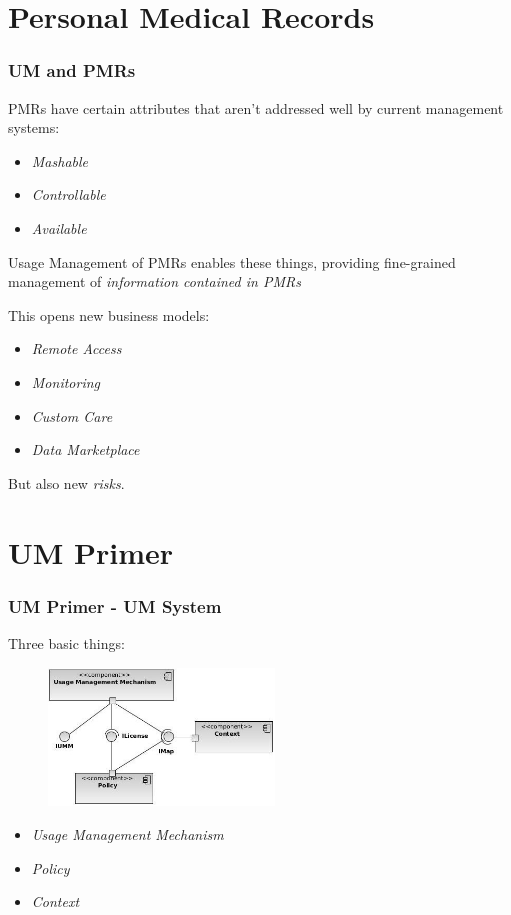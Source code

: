 \documentclass[t, 10pt]{beamer}
\begin{document}
\section{Personal Medical Records}
\begin{frame}
\frametitle{UM and PMRs}

PMRs have certain attributes that aren't addressed well by current management systems:
\pause
\begin{itemize}
\item \textit{Mashable}
\pause
\item \textit{Controllable}
\pause
\item \textit{Available}
\end{itemize}
\pause

Usage Management of PMRs enables these things, providing fine-grained management of \textit{information contained in PMRs}
\newline
\pause

This opens new business models:
\pause
\begin{itemize}
\item \textit{Remote Access}
\pause
\item \textit{Monitoring}
\pause
\item \textit{Custom Care}
\pause
\item \textit{Data Marketplace}
\end{itemize}
\pause

But also new \textit{risks}.
 
\end{frame}

\section{UM Primer}
\begin{frame}
\frametitle{UM Primer - UM System}

Three basic things:
\begin{figure}
\includegraphics[width = 6cm]{Integrated}
\end{figure}

\begin{itemize}
\item \textit{Usage Management Mechanism}
\item \textit{Policy}
\item \textit{Context}
\end{itemize}

\end{frame}
\end{document}
